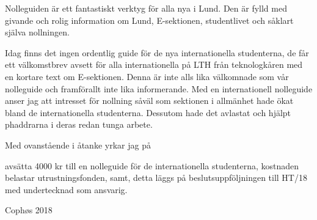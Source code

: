 \documentclass[../_main/handlingar.tex]{subfiles}
\begin{document}

Nolleguiden är ett fantastiskt verktyg för alla nya i Lund. Den är fylld med givande och rolig information om Lund, E-sektionen, studentlivet och såklart själva nollningen.
 
Idag finns det ingen ordentlig guide för de nya internationella studenterna, de får ett välkomstbrev avsett för alla internationella på LTH från teknologkåren med en kortare text om E-sektionen. Denna är inte alls lika välkomnade som vår nolleguide och framförallt inte lika informerande. Med en internationell nolleguide anser jag att intresset för nollning såväl som sektionen i allmänhet hade ökat bland de internationella studenterna. Dessutom hade det avlastat och hjälpt phaddrarna i deras redan tunga arbete. 
 
Med ovanstående i åtanke yrkar jag på  


\begin{attsatser}
    \att avsätta 4000 kr till en nolleguide för de internationella studenterna, 
    \att kostnaden belastar utrustningsfonden, samt,
    \att detta läggs på beslutsuppföljningen till HT/18 med undertecknad som ansvarig.
\end{attsatser}

\begin{signatures}{1}
    \mvh
    \signature{Edvard Carlsson}{Cophøs 2018}
\end{signatures}
\end{document}
